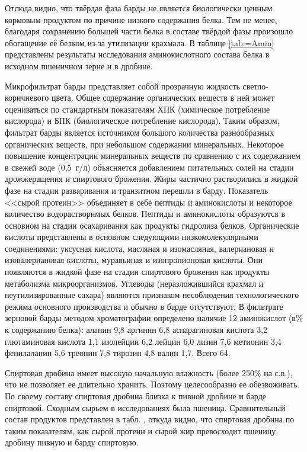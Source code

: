 
Отсюда видно, что твёрдая фаза барды не является биологически ценным кормовым продуктом по причине низкого содержания белка. Тем не менее, благодаря сохранению большей части белка в составе твёрдой фазы произошло обогащение её белком из-за утилизации крахмала.
В таблице \ref{tab:=Amin} представлены результаты исследования аминокислотного состава белка в исходном пшеничном зерне и в дробине.


Микрофильтрат барды представляет собой прозрачную жидкость светло-коричневого цвета.
Общее содержание органических веществ в ней может оцениваться по стандартным показателям ХПК (химическое потребление кислорода) и БПК (биологическое потребление кислорода).
Таким образом, фильтрат барды является источником большого количества разнообразных органических веществ, при небольшом содержании минеральных.
Некоторое повышение концентрации минеральных веществ по сравнению с их содержанием в свежей воде (0,5~г/л) объясняется добавлением питательных солей на стадии дрожжеращения и спиртового брожения.
Жиры частично растворились в жидкой фазе на стадии разваривания и транзитном перешли в барду.
Показатель <<сырой протеин>> объединяет в себе пептиды и аминокислоты и некоторое количество водорастворимых белков. Пептиды и аминокислоты образуются в основном на стадии осахаривания как продукты гидролиза белков.
Органические кислоты представлены в основном следующими низкомолекулярными соединениями: уксусная кислота, масляная и изомасляная, валериановая и изовалериановая кислоты, муравьиная и изопропионовая кислоты.
Они появляются в жидкой фазе на стадии спиртового брожения как продукты метаболизма микроорганизмов.
Углеводы (неразложившийся крахмал и неутилизированные сахара) являются признаком несоблюдения технологического режима основного производства и обычно в барде отсутствуют.
В фильтрате зерновой барды методом хроматографии определено наличие 12 аминокислот (в\% к содержанию белка): аланин 9,8 аргинин 6,8 аспарагиновая кислота 3,2 глютаминовая кислота 1,1 изолейцин 6,2 лейцин 6,0 лизин 7,6 метионин 3,4 фенилаланин 5,6 треонин 7,8 тирозин 4,8 валин 1,7.
Всего 64.

Спиртовая дробина имеет высокую начальную влажность (более 250\% на с.в.), что не позволяет ее длительно хранить.
Поэтому целесообразно ее обезвоживать.
По своему составу спиртовая дробина близка к пивной дробине и барде спиртовой.
Сходным сырьем в исследованиях была пшеница.
Сравнительный состав продуктов представлен в табл. , откуда видно, что спиртовая дробина по таким показателям, как сырой протеин и сырой жир превосходит пшеницу, дробину пивную и барду спиртовую.~\cite{Oleinikov.Svoystva.2010}


